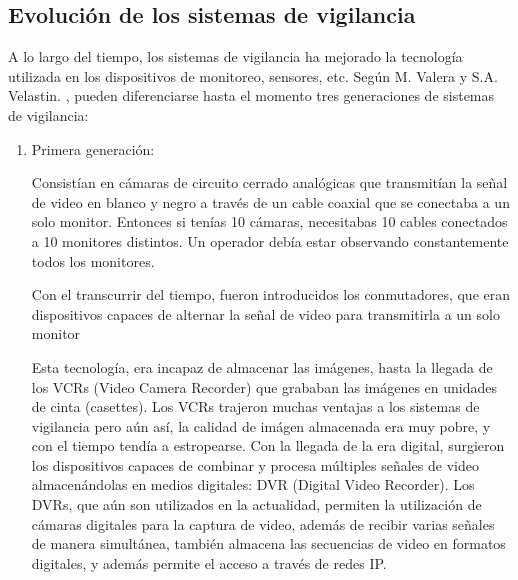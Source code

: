 \documentclass[a4paper,12pt,twoside]{article}
\begin{document}
\subsection{Evolución de los sistemas de vigilancia}
A lo largo del tiempo, los sistemas de vigilancia ha mejorado la tecnología utilizada en los dispositivos de monitoreo, sensores, etc. Según M. Valera y S.A. Velastin. \cite{valera}, pueden diferenciarse hasta el momento tres generaciones de sistemas de vigilancia:
\begin{enumerate}
	\baselineskip 16pt
	\item Primera generación: \par 
	Consistían en cámaras de circuito cerrado analógicas que transmitían la señal de video en blanco y negro a través de un cable coaxial que se conectaba a un solo monitor. Entonces si tenías 10 cámaras, necesitabas 10 cables conectados a 10 monitores distintos. Un operador debía estar observando constantemente todos los monitores. \par 
	Con el transcurrir del tiempo, fueron introducidos los conmutadores, que eran dispositivos capaces de alternar la señal de video para transmitirla a un solo monitor \par  
	Esta tecnología, era incapaz de almacenar las imágenes, hasta la llegada de los VCRs (Video Camera Recorder) que grababan las imágenes en unidades de cinta (casettes). Los VCRs trajeron muchas ventajas a los sistemas de vigilancia pero aún así, la calidad de imágen almacenada era muy pobre, y con el tiempo tendía a estropearse. Con la llegada de la era digital, surgieron los dispositivos capaces de combinar y procesa múltiples señales de video almacenándolas en medios digitales: DVR (Digital Video Recorder). Los DVRs, que aún son utilizados en la actualidad, permiten la utilización de cámaras digitales para la captura de video, además de recibir varias señales de manera simultánea, también almacena las secuencias de video en formatos digitales, y además permite el acceso a través de redes IP.\\	
	

\end{enumerate}
\end{document}

